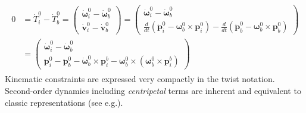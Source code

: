 \documentclass[a4paper,twoside, openright,12pt]{report}
\newcommand{\f}[1]{\boldsymbol{#1}}
\begin{document}
{\begin{eqnarray}
\begin{aligned}
0 &= \dot{T}_i^0 - \dot{T}_b^0 = \begin{pmatrix}
\dot{\boldsymbol{\omega}}_i^0 - \dot{\boldsymbol{\omega}}_b^0 \\ \dot{\f{v}}_i^0 - \dot{\f{v}}_b^0
\end{pmatrix} =
\begin{pmatrix}
\dot{\boldsymbol{\omega}}_i^0 - \dot{\boldsymbol{\omega}}_b^0 \\ \frac{d}{dt}(\dot{\f{p}}_i^0 - \boldsymbol{\omega}_b^0 \times \f{p}_i^0) - \frac{d}{dt}(\dot{\f{p}}_b^0 - \boldsymbol{\omega}_b^0 \times \f{p}_b^0)
\end{pmatrix}\\
 &=
\begin{pmatrix}
\dot{\boldsymbol{\omega}}_i^0 - \dot{\boldsymbol{\omega}}_b^0 \\
\ddot{\f{p}}_i^0 - \ddot{\f{p}}_b^0 - \dot{\boldsymbol{\omega}}_b^0 \times \f{p}_i^b - \boldsymbol{\omega}_b^0 \times (\boldsymbol{\omega}_b^0 \times \f{p}_i^b)
\end{pmatrix}
\end{aligned}
\end{eqnarray}
Kinematic constraints are expressed very compactly in the twist notation. Second-order dynamics including \emph{centripetal} terms are inherent and equivalent to classic representations (see e.g.\cite{Erhart_16}).\\

}
\end{document}
